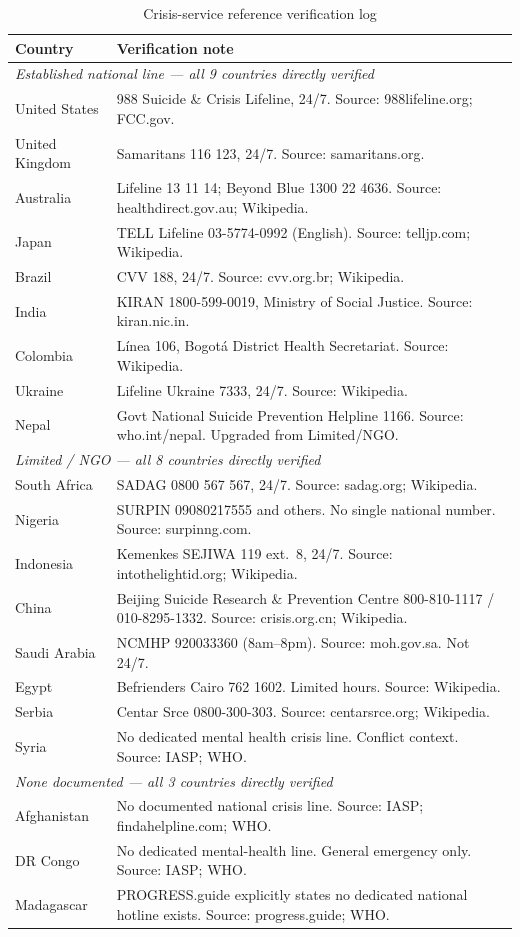 \begin{table}[H]
\centering
\caption{Crisis-service reference verification log}
\label{tab:refverify}
\begin{tabular}{lp{9cm}}
\toprule
Country & Verification note \\
\midrule
\multicolumn{2}{l}{\textit{Established national line — all 9 countries directly verified}} \\
United States & 988 Suicide \& Crisis Lifeline, 24/7. Source: 988lifeline.org; FCC.gov. \\
United Kingdom & Samaritans 116 123, 24/7. Source: samaritans.org. \\
Australia & Lifeline 13 11 14; Beyond Blue 1300 22 4636. Source: healthdirect.gov.au; Wikipedia. \\
Japan & TELL Lifeline 03-5774-0992 (English). Source: telljp.com; Wikipedia. \\
Brazil & CVV 188, 24/7. Source: cvv.org.br; Wikipedia. \\
India & KIRAN 1800-599-0019, Ministry of Social Justice. Source: kiran.nic.in. \\
Colombia & Línea 106, Bogotá District Health Secretariat. Source: Wikipedia. \\
Ukraine & Lifeline Ukraine 7333, 24/7. Source: Wikipedia. \\
Nepal & Govt National Suicide Prevention Helpline 1166. Source: who.int/nepal. Upgraded from Limited/NGO. \\
\midrule
\multicolumn{2}{l}{\textit{Limited / NGO — all 8 countries directly verified}} \\
South Africa & SADAG 0800 567 567, 24/7. Source: sadag.org; Wikipedia. \\
Nigeria & SURPIN 09080217555 and others. No single national number. Source: surpinng.com. \\
Indonesia & Kemenkes SEJIWA 119 ext.~8, 24/7. Source: intothelightid.org; Wikipedia. \\
China & Beijing Suicide Research \& Prevention Centre 800-810-1117 / 010-8295-1332. Source: crisis.org.cn; Wikipedia. \\
Saudi Arabia & NCMHP 920033360 (8am--8pm). Source: moh.gov.sa. Not 24/7. \\
Egypt & Befrienders Cairo 762 1602. Limited hours. Source: Wikipedia. \\
Serbia & Centar Srce 0800-300-303. Source: centarsrce.org; Wikipedia. \\
Syria & No dedicated mental health crisis line. Conflict context. Source: IASP; WHO. \\
\midrule
\multicolumn{2}{l}{\textit{None documented — all 3 countries directly verified}} \\
Afghanistan & No documented national crisis line. Source: IASP; findahelpline.com; WHO. \\
DR Congo & No dedicated mental-health line. General emergency only. Source: IASP; WHO. \\
Madagascar & PROGRESS.guide explicitly states no dedicated national hotline exists. Source: progress.guide; WHO. \\
\bottomrule
\end{tabular}
\end{table}

